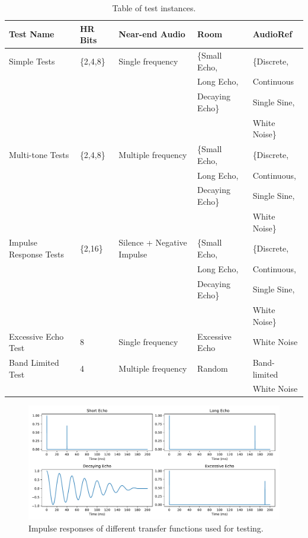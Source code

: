 \documentclass[a4paper,10pt]{article}
\begin{document}
\begin{table}[h]
    \centering
\begin{tabular}{l|l|l|l|l}
    Test Name & HR Bits & Near-end Audio  & Room & AudioRef \\
    \hline
 Simple Tests
 & \{2,4,8\} & Single frequency           & \{Small Echo,      & \{Discrete, \\
 &           &                            & Long Echo,         & Continuous \\
 &           &                            & Decaying Echo\}    & Single Sine,\\
 &           &                            &                    & White Noise\}\\
 \hline
 Multi-tone Tests
 & \{2,4,8\} & Multiple frequency         & \{Small Echo,      & \{Discrete, \\
 &           &                            & Long Echo,         &  Continuous,\\
 &           &                            & Decaying Echo\}    & Single Sine, \\
 &           &                            &                    & White Noise\}\\
 \hline
 Impulse Response Tests
 & \{2,16\} & Silence + Negative Impulse & \{Small Echo,      & \{Discrete, \\
 &           &                            & Long Echo,         &  Continuous,\\
 &           &                            & Decaying Echo\}    & Single Sine,\\
 &           &                            &                    & White Noise\}\\
 \hline
 Excessive Echo Test
 & 8         & Single frequency           & Excessive Echo     & White Noise \\
 \hline
 Band Limited Test
 & 4         & Multiple frequency         & Random             & Band-limited\\
 & & & & White Noise\\
\end{tabular}
\caption{Table of test instances.}
\label{tab-tests}
\end{table}

\begin{figure}[h]
\includegraphics[width=\textwidth]{H}
\caption{Impulse responses of different transfer functions used for testing.}
\label{h-plots}
\end{figure}
\end{document}
